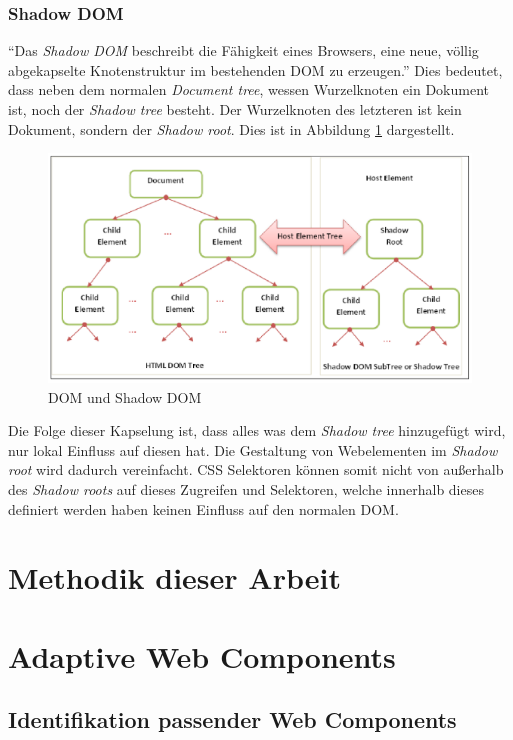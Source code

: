 \documentclass[12pt, paper=a4, bibtotoc, toc=listof]{scrreprt}
\begin{document}
			\subsection{Shadow DOM}
			\enquote{Das \emph{Shadow \ac{DOM}} beschreibt die Fähigkeit eines Browsers, eine neue, völlig abgekapselte Knotenstruktur im bestehenden \ac{DOM} zu erzeugen.} Dies bedeutet, dass neben dem normalen \emph{Document tree}, wessen Wurzelknoten ein Dokument ist, noch der \emph{Shadow tree} besteht. Der Wurzelknoten des letzteren ist kein Dokument, sondern der \emph{Shadow root}. Dies ist in Abbildung \ref{img:shaDom} dargestellt. 
			\begin{figure}[ht]
				\centering
				\includegraphics{shaDom.png}
				\caption{DOM und Shadow \ac{DOM} }
				\label{img:shaDom}
			\end{figure}
			Die Folge dieser Kapselung ist, dass alles was dem \emph{Shadow tree} hinzugefügt wird, nur lokal Einfluss auf diesen hat. Die Gestaltung von Webelementen im \emph{Shadow root} wird dadurch vereinfacht.
			\ac{CSS} Selektoren können somit nicht von außerhalb des \emph{Shadow roots} auf dieses Zugreifen und Selektoren, welche innerhalb dieses definiert werden haben keinen Einfluss auf den normalen \ac{DOM}.
			
				
	\chapter{Methodik dieser Arbeit}
	\chapter{Adaptive Web Components}
		\section{Identifikation passender Web Components}
\end{document}
